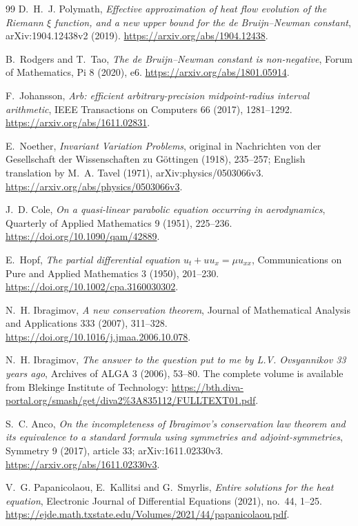 \documentclass[11pt]{article}
\theoremstyle{remark}
\begin{document}
\begin{thebibliography}{99}
D.~H.~J. Polymath,
\emph{Effective approximation of heat flow evolution of the Riemann
\(\xi\) function, and a new upper bound for the de Bruijn--Newman constant},
arXiv:1904.12438v2 (2019).
\url{https://arxiv.org/abs/1904.12438}.

B.~Rodgers and T.~Tao,
\emph{The de Bruijn--Newman constant is non-negative},
Forum of Mathematics, Pi 8 (2020), e6.
\url{https://arxiv.org/abs/1801.05914}.

F.~Johansson,
\emph{Arb: efficient arbitrary-precision midpoint-radius interval arithmetic},
IEEE Transactions on Computers 66 (2017), 1281--1292.
\url{https://arxiv.org/abs/1611.02831}.

E.~Noether,
\emph{Invariant Variation Problems},
original in Nachrichten von der Gesellschaft der Wissenschaften zu
G\"ottingen (1918), 235--257; English translation by M.~A. Tavel (1971),
arXiv:physics/0503066v3.
\url{https://arxiv.org/abs/physics/0503066v3}.

J.~D. Cole,
\emph{On a quasi-linear parabolic equation occurring in aerodynamics},
Quarterly of Applied Mathematics 9 (1951), 225--236.
\url{https://doi.org/10.1090/qam/42889}.

E.~Hopf,
\emph{The partial differential equation \(u_t+uu_x=\mu u_{xx}\)},
Communications on Pure and Applied Mathematics 3 (1950), 201--230.
\url{https://doi.org/10.1002/cpa.3160030302}.

N.~H. Ibragimov,
\emph{A new conservation theorem},
Journal of Mathematical Analysis and Applications 333 (2007), 311--328.
\url{https://doi.org/10.1016/j.jmaa.2006.10.078}.

N.~H. Ibragimov,
\emph{The answer to the question put to me by L.V. Ovsyannikov 33 years ago},
Archives of ALGA 3 (2006), 53--80.
The complete volume is available from Blekinge Institute of Technology:
\url{https://bth.diva-portal.org/smash/get/diva2%3A835112/FULLTEXT01.pdf}.

S.~C. Anco,
\emph{On the incompleteness of Ibragimov's conservation law theorem and
its equivalence to a standard formula using symmetries and adjoint-symmetries},
Symmetry 9 (2017), article 33; arXiv:1611.02330v3.
\url{https://arxiv.org/abs/1611.02330v3}.

V.~G. Papanicolaou, E.~Kallitsi and G.~Smyrlis,
\emph{Entire solutions for the heat equation},
Electronic Journal of Differential Equations (2021), no.~44, 1--25.
\url{https://ejde.math.txstate.edu/Volumes/2021/44/papanicolaou.pdf}.



\end{thebibliography}
\end{document}
